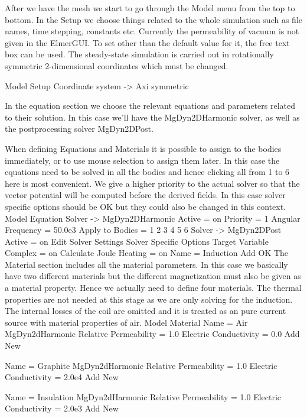 After we have the mesh we start to go through the Model menu from the top to bottom. 
In the Setup we choose things related to the whole simulation such as file names, 
time stepping, constants etc.  Currently the permeability of vacuum is not given
in the ElmerGUI. To set other than the default value for it, the free text box can be used. 
The steady-state simulation is carried out in rotationally symmetric 2-dimensional 
coordinates which must be changed.

\ttbegin
Model
  Setup  
    Coordinate system -> Axi symmetric
\ttend
 
In the equation section we choose the relevant equations and parameters related to their solution. 
In this case we'll have the MgDyn2DHarmonic solver, as well as the postprocessing solver MgDyn2DPost.

When defining Equations and Materials it is possible to assign to the bodies immediately, or to use mouse
selection to assign them later. In this case the equations need to be solved in all the bodies and 
hence clicking all from 1 to 6 here is most convenient. We give a higher priority to the actual solver
so that the vector potential will be computed before the derived fields. 
In this case solver specific options should be OK but they could also be changed in this context.
\ttbegin
Model
  Equation
	Solver -> MgDyn2DHarmonic
      Active = on
      Priority = 1
      Angular Frequency = 50.0e3
      Apply to Bodies = 1 2 3 4 5 6
    Solver -> MgDyn2DPost
      Active = on
      Edit Solver Settings
        Solver Specific Options
          Target Variable Complex = on
          Calculate Joule Heating = on
    Name = Induction
    Add 
    OK
\ttend        
The Material section includes all the material parameters. In this case we basically have two 
different materials but the different magnetization must also be given as a material property.
Hence we actually need to define four materials. The thermal properties are not needed at this stage as 
we are only solving for the induction. The internal losses of the coil are omitted and it is treated as an
pure current source with material properties of air.  
\ttbegin
Model
  Material
    Name = Air
    MgDyn2dHarmonic
      Relative Permeability = 1.0
      Electric Conductivity = 0.0
    Add
    New
	
    Name = Graphite
    MgDyn2dHarmonic
      Relative Permeability = 1.0
      Electric Conductivity = 2.0e4
    Add
    New

    Name = Insulation
    MgDyn2dHarmonic
      Relative Permeability = 1.0
      Electric Conductivity = 2.0e3
    Add
    New

